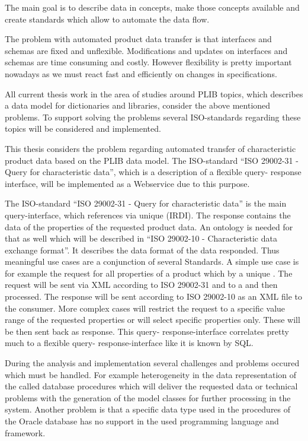 The main goal is to describe data in concepts, make those concepts available and create standards which allow to automate the data flow.  

The problem with automated product data transfer is that interfaces and schemas are fixed and unflexible. Modifications and updates on interfaces and schemas are time consuming and costly. However flexibility is pretty important nowadays as we must react fast and efficiently on changes in specifications. 
 
All current thesis work in the area of studies around \gls{PLIB} topics, which describes a data model for dictionaries and libraries, consider the above mentioned problems. To support solving the problems several ISO-standards regarding these topics will be considered and implemented. 

This thesis considers the problem regarding automated transfer of characteristic product data based on the \gls{PLIB} data model. The ISO-standard \enquote{ISO 29002-31 - Query for characteristic data}, which is a description of a flexible query- response interface, will be implemented as a Webservice due to this purpose. 

The ISO-standard \enquote{ISO 29002-31 - Query for characteristic data} is the main query-interface, which references  via unique  (IRDI).
The response contains the data of the properties of the requested product data. An ontology is needed for that as well which will be described in \enquote{ISO 29002-10 - Characteristic data exchange format}. It describes the data format of the data responded. Thus meaningful use cases are a conjunction of several Standards. 
A simple use case is for example the request for all properties of a product which by a unique . The request will be sent via XML according to ISO 29002-31 and to a  and then processed. The response will be sent according to ISO 29002-10 as an XML file to the consumer. More complex cases will restrict the request to a specific value range of the requested properties or will select specific properties only. These will be then sent back as response. This query- response-interface correlates pretty much to a flexible query- response-interface like it is known by SQL. 

During the analysis and implementation several challenges and problems occured which must be handled. For example heterogeneity in the data representation of the called database procedures which will deliver the requested data or technical problems with the generation of the model classes for further processing in the system. Another problem is that a specific data type used in the procedures of the Oracle database has no support in the used programming language and framework.  
 
